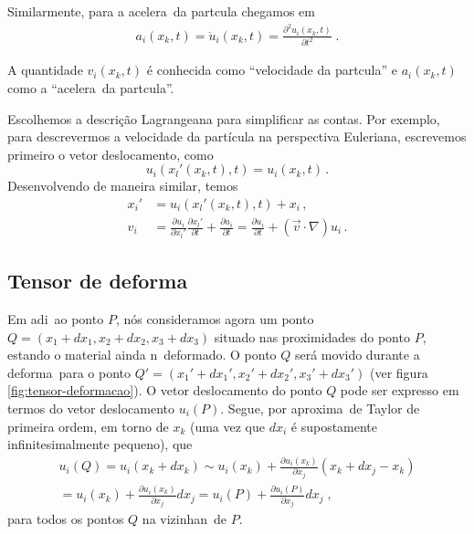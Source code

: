 Similarmente, para a acelera\cao\ da part\ih cula chegamos em
\begin{eqnarray}
a_i(x_k,t) = \ddot{u}_i(x_k,t) = \frac{\partial^2 u_i(x_k,t)}
{\partial t^2} \; .
\end{eqnarray}

A quantidade $v_i(x_k,t)$ \'e conhecida como ``velocidade
da part\ih cula'' e $a_i(x_k,t)$ como a ``acelera\cao\ da
part\ih cula''.

Escolhemos a descri\c{c}\~ao Lagrangeana para simplificar as contas. Por
exemplo, para descrevermos a velocidade da part\'icula na perspectiva Euleriana,
escrevemos primeiro o vetor deslocamento, como
\begin{equation}
   u_i(x_l'(x_k,t),t)=u_i(x_k,t) \, .
\end{equation}
Desenvolvendo de maneira similar, temos
\begin{align}
  x_i'&=u_i(x_l'(x_k,t),t) +  x_i \, , \\
  v_i &= \frac{\partial u_i}{\partial x_l'}\frac{\partial x_l'}{\partial t}
  +\frac{\partial u_i}{\partial t} = \frac{\partial u_i}{\partial t} +
  (\vec{v}\cdot\nabla)u_i \, .
\end{align}
\subsection{Tensor de deforma\cao}

Em adi\cao\ ao ponto $P$, n\'os consideramos agora um ponto
$Q=(x_1+dx_1,x_2+dx_2,x_3+dx_3)$ situado nas proximidades do
ponto $P$, estando o material ainda n\ao\ deformado. O
ponto $Q$ ser\'a movido durante a deforma\cao\ para o ponto
$Q'=(x_1'+dx_1',x_2'+dx_2',x_3'+dx_3')$ (ver figura \ref{fig:tensor-deformacao}). O vetor
deslocamento do ponto $Q$ pode ser expresso em termos do
vetor deslocamento $u_i(P)$. Segue, por aproxima\cao\ de Taylor de
primeira ordem, em torno de $x_k$ (uma vez que $dx_i$ \'e supostamente infinitesimalmente
pequeno), que
\begin{eqnarray} \label{vdq}
u_i(Q) = u_i(x_k+dx_k) \sim u_i(x_k) +
\frac{\partial u_i(x_k)}
{\partial x_j} (x_k + dx_j - x_k) \nonumber \\
 = u_i(x_k) +\frac{\partial u_i(x_k)}
{\partial x_j} dx_j = u_i(P) + \frac{\partial u_i(P)}
{\partial x_j} dx_j \; ,
\end{eqnarray}
para todos os pontos $Q$ na vizinhan\ca\ de $P$.

